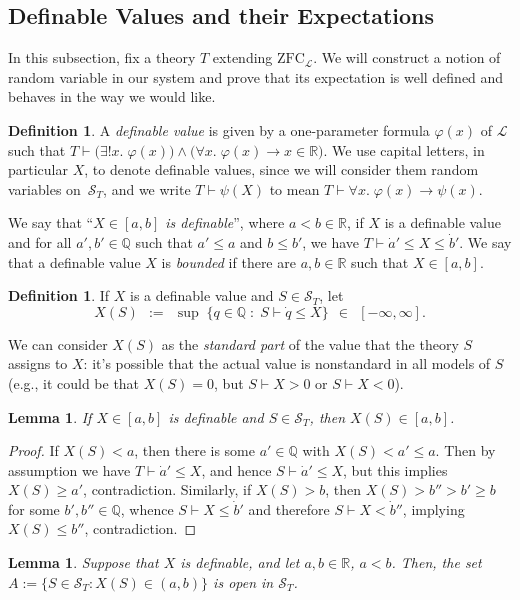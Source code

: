 \documentclass[12pt]{article}
\newcommand{\RR}{\mathbb{R}}
\newcommand{\QQ}{\mathbb{Q}}
\newcommand{\zfc}{\mathrm{ZFC}}
\newcommand{\zfcl}{{\zfc_\cL}}
\newcommand{\cL}{\mathcal{L}}
\newcommand{\cS}{\mathcal{S}}
\theoremstyle{plain}
\newtheorem{lemma}[theorem]{Lemma}
\theoremstyle{definition}
\newtheorem{definition}[theorem]{Definition}
\theoremstyle{remark}
\begin{document}
\subsection{Definable Values and their Expectations}
In this subsection, fix a theory $T$ extending $\zfcl$. We will construct a notion of random variable in our system and prove that its expectation is well defined and behaves in the way we would like.
\begin{definition}
A \emph{definable value} is given by a one-parameter formula $\varphi(x)$ of $\cL$ such that $T\vdash\big(\exists!x.\;\varphi(x)\big)\wedge\big(\forall x.\;\varphi(x)\to x\in\RR\big)$. We use capital letters, in particular $X$, to denote definable values, since we will consider them random variables on~$\cS_T$, and we write $T\vdash\psi(X)$ to mean $T\vdash\forall x.\;\varphi(x)\to\psi(x)$.

We say that ``\emph{$X\in[a,b]$ is definable}'', where $a<b\in\RR$, if $X$ is a definable value and for all $a',b'\in\QQ$ such that $a'\le a$ and $b\le b'$, we have $T\vdash\dot a'\le X\le \dot b'$.
We say that a definable value $X$ is \emph{bounded} if there are $a,b\in\RR$ such that $X\in[a,b]$.
\end{definition}
\begin{definition}
If $X$ is a definable value and $S\in\cS_T$, let
\[X(S) \;\,:=\;\, \sup\;\{q\in\QQ \;:\; S\vdash \dot q \le X\} \;\,\in\;\, [-\infty,\infty].\]
\end{definition}
We can consider $X(S)$ as the \emph{standard part} of the value that the theory $S$ assigns to $X$: it's possible that the actual value is nonstandard in all models of $S$ (e.g., it could be that $X(S) = 0$, but $S\vdash X>0$ or $S\vdash X<0$).
\begin{lemma}
If $X\in[a,b]$ is definable and $S\in\cS_T$, then $X(S)\in[a,b]$.
\end{lemma}
\begin{proof}
If $X(S) < a$, then there is some $a'\in\QQ$ with $X(S) < a' \le a$. Then by assumption we have $T\vdash\dot a'\le X$, and hence $S\vdash\dot a'\le X$, but this implies $X(S)\ge a'$, contradiction. Similarly, if $X(S) > b$, then $X(S) > b'' > b' \ge b$ for some $b',b''\in\QQ$, whence $S\vdash X\le\dot b'$ and therefore $S\vdash X<\dot b''$, implying $X(S) \le b''$, contradiction.
\end{proof}
\begin{lemma}
Suppose that $X$ is definable, and let $a,b\in\RR$, $a<b$. Then, the set $A := \{S\in\cS_T : X(S) \in (a,b)\}$ is open in $\cS_T$.
\end{lemma}
\end{document}
